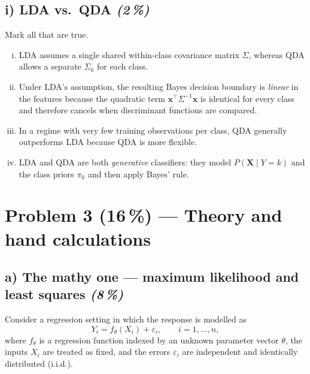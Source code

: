 \documentclass[11pt,a4paper]{article}
\newcommand{\points}[1]{\textbf{(#1\,\%)}}
\newcommand{\subpoints}[1]{\textit{(#1\,\%)}}
\begin{document}
\subsection*{i) LDA vs.\ QDA \subpoints{2}}
Mark all that are true.
\begin{enumerate}[(i)]
  \item LDA assumes a single shared within-class covariance matrix $\Sigma$, whereas QDA allows a separate $\Sigma_k$ for each class.
  \item Under LDA's assumption, the resulting Bayes decision boundary is \emph{linear} in the features because the quadratic term $\mathbf{x}^\top \Sigma^{-1} \mathbf{x}$ is identical for every class and therefore cancels when discriminant functions are compared.
  \item In a regime with very few training observations per class, QDA generally outperforms LDA because QDA is more flexible.
  \item LDA and QDA are both \emph{generative} classifiers: they model $P(\mathbf{X}\mid Y\!=\!k)$ and the class priors $\pi_k$ and then apply Bayes' rule.
\end{enumerate}

\vfill\eject

\section*{Problem 3 \points{16} --- Theory and hand calculations}

\subsection*{a) The mathy one --- maximum likelihood and least squares \subpoints{8}}

Consider a regression setting in which the response is modelled as
$$Y_i = f_\theta(X_i) + \varepsilon_i, \qquad i = 1,\dots,n,$$
where $f_\theta$ is a regression function indexed by an unknown parameter vector $\theta$, the inputs $X_i$ are treated as fixed, and the errors $\varepsilon_i$ are independent and identically distributed (i.i.d.).
\end{document}

